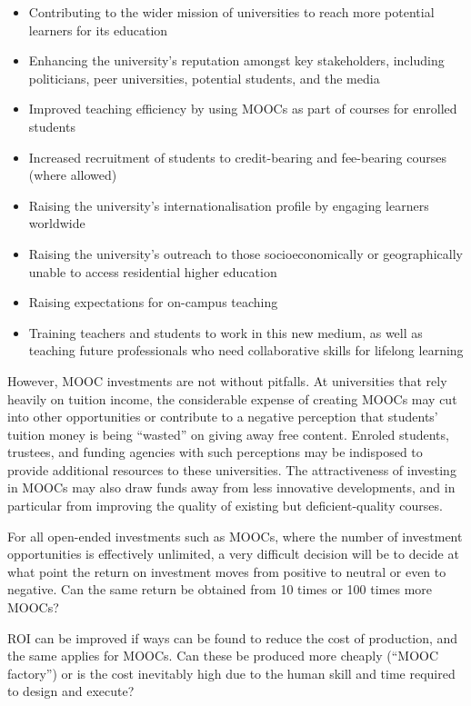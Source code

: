 \begin{itemize}

\item Contributing to the wider mission of universities to reach more
potential learners for its education
\item  Enhancing the university's
reputation amongst key stakeholders, including politicians, peer
universities, potential students, and the media 
\item Improved teaching efficiency  by using MOOCs as part of courses
  for enrolled students 
\item Increased recruitment of students to credit-bearing and
  fee-bearing courses (where allowed)
\item Raising the university's
internationalisation profile  by engaging learners
worldwide
\item  Raising the university's outreach to those socioeconomically or
  geographically unable to
access residential higher education
\item Raising expectations for
on-campus teaching
\item Training teachers and
students to work  in this new medium, as well as teaching future
professionals who need collaborative skills for lifelong learning 

\end{itemize}

However, MOOC investments are not without pitfalls.
At universities that rely heavily on tuition income, the considerable
expense of creating MOOCs may cut into other opportunities or
contribute to a negative perception that students' tuition money is
being ``wasted'' on giving away free content.
Enroled students, trustees, and funding agencies with such perceptions
may be indisposed to provide additional resources to these universities.
The attractiveness of investing in MOOCs may also draw funds away from less
innovative developments, and in particular from improving the quality of
existing but deficient-quality courses.
 
For all open-ended investments such as MOOCs, where the number of
investment opportunities is effectively unlimited, a very difficult
decision will be to decide at what point the return on investment moves
from positive to neutral or even to negative.  Can the same return be
obtained from 10 times or 100 times more MOOCs?
 
ROI can be improved if ways can be found to reduce the cost of
production, and the same applies for MOOCs.  Can these be produced more
cheaply (``MOOC factory'') or is the cost inevitably high due to the human
skill and time required to design and execute?


